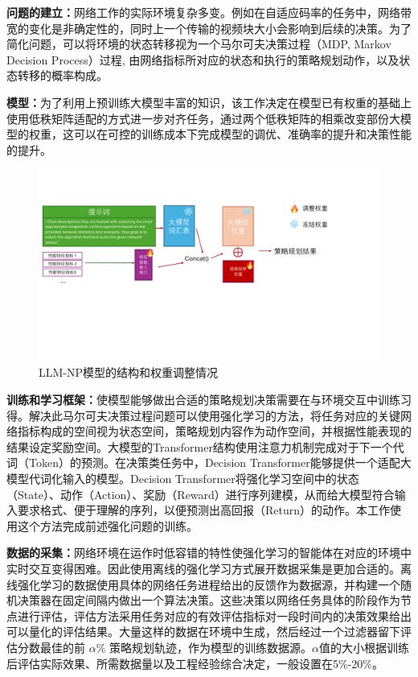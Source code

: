 \textbf{问题的建立：}网络工作的实际环境复杂多变。例如在自适应码率的任务中，网络带宽的变化是非确定性的，同时上一个传输的视频块大小会影响到后续的决策。为了简化问题，可以将环境的状态转移视为一个马尔可夫决策过程（MDP, Markov Decision Process）过程, 由网络指标所对应的状态和执行的策略规划动作，以及状态转移的概率构成。

\textbf{模型：}为了利用上预训练大模型丰富的知识，该工作决定在模型已有权重的基础上使用低秩矩阵适配的方式进一步对齐任务，通过两个低秩矩阵的相乘改变部份大模型的权重，这可以在可控的训练成本下完成模型的调优、准确率的提升和决策性能的提升。

\begin{figure} [h!]
\centering
\includegraphics[width=\linewidth]{figures/chap04/model.pdf} 
\caption{LLM-NP模型的结构和权重调整情况}
\label{fig_model}
\end{figure}

\textbf{训练和学习框架：}使模型能够做出合适的策略规划决策需要在与环境交互中训练习得。解决此马尔可夫决策过程问题可以使用强化学习的方法，将任务对应的关键网络指标构成的空间视为状态空间，策略规划内容作为动作空间，并根据性能表现的结果设定奖励空间。大模型的Transformer结构使用注意力机制完成对于下一个代词（Token）的预测。在决策类任务中，Decision Transformer\cite{chen2021decision}能够提供一个适配大模型代词化输入的模型。Decision Transformer将强化学习空间中的状态（State）、动作（Action）、奖励（Reward）进行序列建模，从而给大模型符合输入要求格式、便于理解的序列，以便预测出高回报（Return）的动作。本工作使用这个方法完成前述强化问题的训练。


\textbf{数据的采集：}网络环境在运作时低容错的特性使强化学习的智能体在对应的环境中实时交互变得困难。因此使用离线的强化学习方式展开数据采集是更加合适的。离线强化学习的数据使用具体的网络任务进程给出的反馈作为数据源，并构建一个随机决策器在固定间隔内做出一个算法决策。这些决策以网络任务具体的阶段作为节点进行评估，评估方法采用任务对应的有效评估指标对一段时间内的决策效果给出可以量化的评估结果。大量这样的数据在环境中生成，然后经过一个过滤器留下评估分数最佳的前 $\alpha$\% 策略规划轨迹，作为模型的训练数据源。$\alpha $值的大小根据训练后评估实际效果、所需数据量以及工程经验综合决定，一般设置在5\%-20\%。


